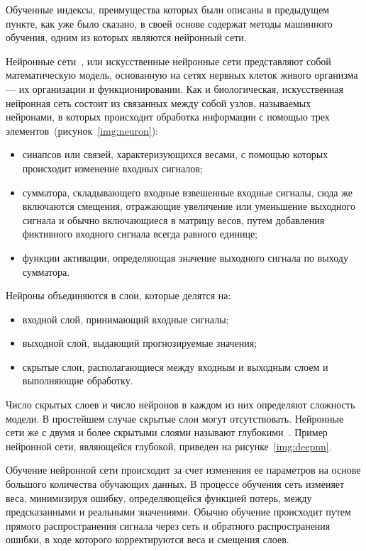 Обученные индексы, преимущества которых были описаны в предыдущем пункте, как
уже было сказано, в своей основе содержат методы машинного обучения, одним из
которых являются нейронный сети.

Нейронные сети~\cite{nndef}, или искусственные нейронные сети представляют собой
математическую модель, основанную на сетях нервных клеток живого организма — их
организации и функционировании. Как и биологическая, искусственная нейронная
сеть состоит из связанных между собой узлов, называемых нейронами, в которых
происходит обработка информации с помощью трех
элементов~(рисунок~\ref{img:neuron}):

\begin{itemize}
    \item синапсов или связей, характеризующихся весами, с помощью которых
        происходит изменение входных сигналов;
    \item сумматора, складывающего входные взвешенные входные сигналы, сюда же
        включаются смещения, отражающие увеличение или уменьшение выходного
        сигнала и обычно включающиеся в матрицу весов, путем добавления
        фиктивного входного сигнала всегда равного единице;
    \item функции активации, определяющая значение выходного сигнала по выходу
        сумматора.
\end{itemize}


Нейроны объединяются в слои, которые делятся на:
\begin{itemize}
    \item входной слой, принимающий входные сигналы;
    \item выходной слой, выдающий прогнозируемые значения;
    \item скрытые слои, располагающиеся между входным и выходным слоем и
        выполняющие обработку.
\end{itemize}

Число скрытых слоев и число нейронов в каждом из них определяют сложность
модели. В простейшем случае скрытые слои могут отсутствовать. Нейронные сети же
с двумя и более скрытыми слоями называют глубокими~\cite{deeplearning}. Пример
нейронной сети, являющейся глубокой, приведен на рисунке~\ref{img:deepnn}.


Обучение нейронной сети происходит за счет изменения ее параметров на основе
большого количества обучающих данных. В процессе обучения сеть изменяет веса,
минимизируя ошибку, определяющейся функцией потерь, между предсказанными и
реальными значениями. Обычно обучение происходит путем прямого распространения
сигнала через сеть и обратного распространения ошибки, в ходе которого
корректируются веса и смещения слоев.


